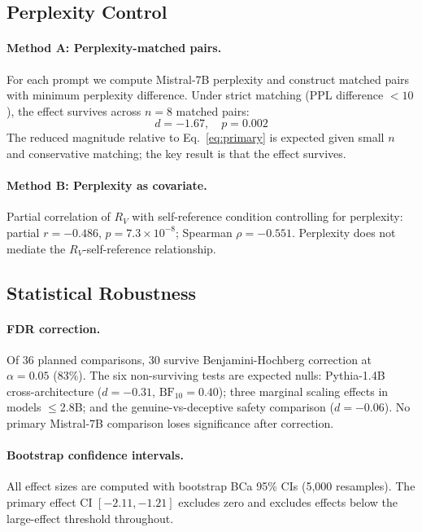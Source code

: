 \documentclass{article}
\newcommand{\RV}{R_V}
\newcommand{\dcohen}{d}
\begin{document}
\subsection{Perplexity Control}
\label{sec:ppl}

\paragraph{Method A: Perplexity-matched pairs.}
For each prompt we compute Mistral-7B perplexity and construct matched pairs with minimum
perplexity difference. Under strict matching (PPL difference $< 10$), the effect survives
across $n = 8$ matched pairs:
\begin{equation}
\dcohen = -1.67, \quad p = 0.002
\label{eq:ppl}
\end{equation}
The reduced magnitude relative to Eq.~\eqref{eq:primary} is expected given small $n$ and
conservative matching; the key result is that the effect survives.

\paragraph{Method B: Perplexity as covariate.}
Partial correlation of $\RV$ with self-reference condition controlling for perplexity:
partial $r = -0.486$, $p = 7.3 \times 10^{-8}$; Spearman $\rho = -0.551$.
Perplexity does not mediate the $\RV$-self-reference relationship.

\subsection{Statistical Robustness}
\label{sec:robust}

\paragraph{FDR correction.}
Of 36 planned comparisons, 30 survive Benjamini-Hochberg correction at $\alpha = 0.05$ (83\%).
The six non-surviving tests are expected nulls: Pythia-1.4B cross-architecture
($\dcohen = -0.31$, $\mathrm{BF}_{10} = 0.40$); three marginal scaling effects in models
$\leq$2.8B; and the genuine-vs-deceptive safety comparison ($\dcohen = -0.06$).
No primary Mistral-7B comparison loses significance after correction.

\paragraph{Bootstrap confidence intervals.}
All effect sizes are computed with bootstrap BCa 95\% CIs (5,000 resamples).
The primary effect CI $[-2.11, -1.21]$ excludes zero and excludes effects below the large-effect
threshold throughout.
\end{document}
